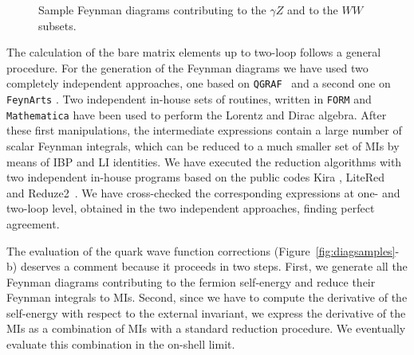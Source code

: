 \documentclass[11pt,a4paper]{article}
\begin{document}
\begin{figure}[ht]
\quad
{}





\caption{Sample Feynman diagrams contributing to the $\gamma Z$ and to the $WW$ subsets.}
\label{fig:EWbosons}
\end{figure}
The calculation of the bare matrix elements up to two-loop follows
a general procedure.
For the generation of the Feynman diagrams we have used two completely independent approaches,
one based on {\tt QGRAF}~\cite{Nogueira:1991ex} and a second one on {\tt FeynArts} \cite{Hahn:2000kx}.
Two independent in-house sets of routines,
written in {\tt FORM} \cite{Vermaseren:2000nd} and {\tt Mathematica} \cite{Mathematica}
have been used to perform the Lorentz and Dirac algebra.
After these first manipulations, the intermediate expressions contain
a large number of scalar Feynman integrals,
which can be reduced to a much smaller set of MIs by means of IBP and LI identities.
We have executed the reduction algorithms with two independent in-house programs based on the public codes
{\sc Kira} \cite{Maierhofer:2017gsa}, {\sc LiteRed}~\cite{Lee:2013mka, Lee:2012cn} and
{\sc Reduze}2~\cite{vonManteuffel:2012np, Studerus:2009ye}.
We have cross-checked the corresponding expressions at one- and two-loop level,
  obtained in the two independent approaches,
finding perfect agreement.

The evaluation of the quark wave function corrections
(Figure~\ref{fig:diagsamples}-b)
deserves a comment because it proceeds in two steps.
First, we generate all the Feynman diagrams contributing to the fermion self-energy
and reduce their Feynman integrals to MIs.
Second, since we have to compute the derivative of the self-energy with respect to the external invariant,
we express the derivative of the MIs as a combination of MIs with a standard reduction procedure.
We eventually evaluate this combination in the on-shell limit.
\end{document}
